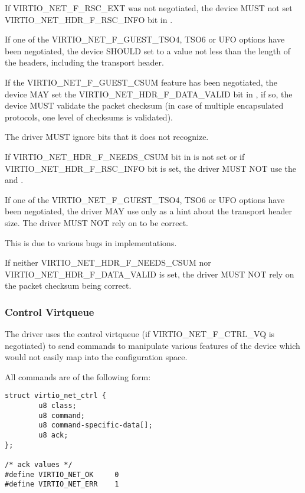 If VIRTIO_NET_F_RSC_EXT was not negotiated, the device MUST
not set VIRTIO_NET_HDR_F_RSC_INFO bit in .

If one of the VIRTIO_NET_F_GUEST_TSO4, TSO6 or UFO options have
been negotiated, the device SHOULD set  to a value
not less than the length of the headers, including the transport
header.

If the VIRTIO_NET_F_GUEST_CSUM feature has been negotiated, the
device MAY set the VIRTIO_NET_HDR_F_DATA_VALID bit in
, if so, the device MUST validate the packet
checksum (in case of multiple encapsulated protocols, one level
of checksums is validated).


The driver MUST ignore  bits that it does not recognize.

If VIRTIO_NET_HDR_F_NEEDS_CSUM bit in  is not set or
if VIRTIO_NET_HDR_F_RSC_INFO bit  is set, the
driver MUST NOT use the  and .

If one of the VIRTIO_NET_F_GUEST_TSO4, TSO6 or UFO options have
been negotiated, the driver MAY use  only as a hint about the
transport header size.
The driver MUST NOT rely on  to be correct.
\begin{note}
This is due to various bugs in implementations.
\end{note}

If neither VIRTIO_NET_HDR_F_NEEDS_CSUM nor
VIRTIO_NET_HDR_F_DATA_VALID is set, the driver MUST NOT
rely on the packet checksum being correct.
\subsubsection{Control Virtqueue}\label{sec:Device Types / Network Device / Device Operation / Control Virtqueue}

The driver uses the control virtqueue (if VIRTIO_NET_F_CTRL_VQ is
negotiated) to send commands to manipulate various features of
the device which would not easily map into the configuration
space.

All commands are of the following form:

\begin{lstlisting}
struct virtio_net_ctrl {
        u8 class;
        u8 command;
        u8 command-specific-data[];
        u8 ack;
};

/* ack values */
#define VIRTIO_NET_OK     0
#define VIRTIO_NET_ERR    1
\end{lstlisting}

